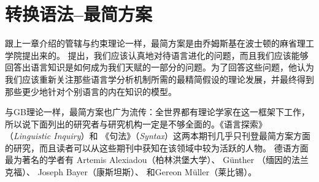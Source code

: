 \chapter{转换语法--最简方案}
\label{Abschnitt-MP}\label{chap-mp}\label{chapter-minimalism}\label{chapter-mp}

跟上一章介绍的管辖与约束理论一样，最简方案是由乔姆斯基在波士顿的麻省理工学院提出来的。 \citet{Chomsky93b-u,Chomsky95a-u}提出，我们应该认真地对待语言进化的问题，而且我们应该能够回答出语言知识是如何成为我们天赋的一部分的问题。为了回答这些问题，他认为我们应该重新关注那些语言学分析机制所需的最精简假设的理论发展，并最终得到那些更少地针对个别语言的内在知识的模型。

与GB理论一样，最简方案也广为流传：全世界都有理论学家在这一框架下工作，所以说下面列出的研究者与研究机构一定是不够全面的。《语言探索》 （\emph{Linguistic Inquiry}）和 《句法》（\emph{Syntax}）这两本期刊几乎只刊登最简方案方面的研究，而且读者可以从这些期刊中获知在该领域中较为活跃的人物。
德语方面最为著名的学者有
Artemis Alexiadou（柏林洪堡大学）、
Günther  \citet{Grewendorf2002a}（缅因的法兰克福）、
Joseph Bayer（康斯坦斯）、
和Gereon Müller（莱比锡）。

